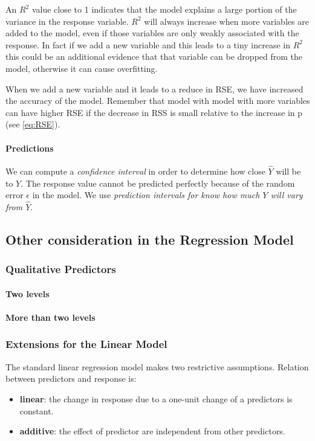 \documentclass[a4paper]{article}
\begin{document}
							An $R^2$ value close to 1 indicates that the model explains a large portion of the variance in the response variable. $R^2$ will always increase when more variables are added to the model, even if those variables are only weakly associated with the response. In fact if we add a new variable and this leads to a tiny increase in $R^2$ this could be an additional evidence that that variable can be dropped from the model, otherwise it can cause overfitting.
							
							When we add a new variable and it leads to a reduce in RSE, we have increased the accuracy of the model. Remember that model with model with more variables can have higher RSE if the decrease in RSS is small relative to the increase in p (see \ref{eq:RSE}).
							
						\paragraph{Predictions}
							We can compute a \textit{confidence interval} in order to determine how close $\hat{Y}$ will be to $Y$. The response value cannot be predicted perfectly because of the random error $\epsilon$ in the model. We use \textit{prediction intervals for know how much $Y$ will vary from $\hat{Y}$}.
							
							
					\subsection{Other consideration in the Regression Model}
					
						\subsubsection{Qualitative Predictors}
							
							\paragraph{Two levels}
							
							\paragraph{More than two levels}
							
						\subsubsection{Extensions for the Linear Model}
							The standard linear regression model makes two restrictive assumptions. Relation between predictors and response is:
							\begin{itemize}
								\item \textbf{linear}: the change in response due to a one-unit change of a predictors is constant.
								\item \textbf{additive}: the effect of predictor are independent from other predictors.
							\end{itemize}
							
\end{document}
